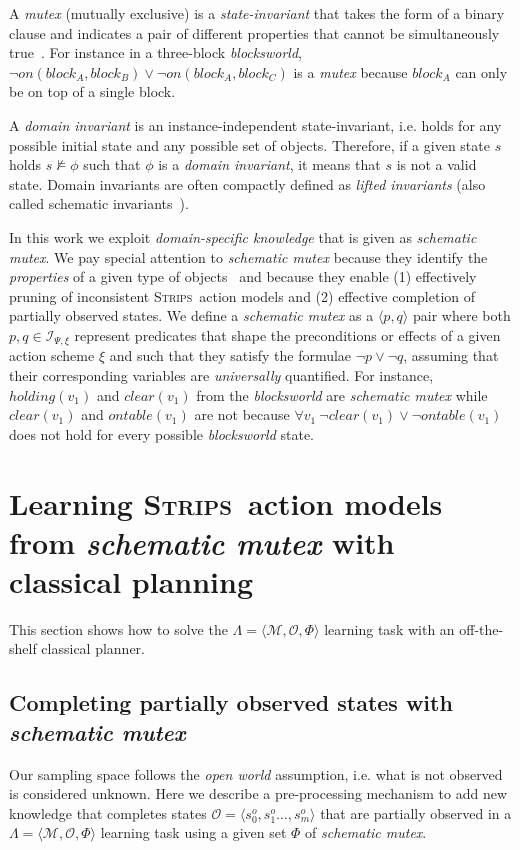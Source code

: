 \documentclass{article}
\newcommand{\tup}[1]{{\langle #1 \rangle}}
\newcommand{\strips}{\textsc{Strips}}
\begin{document}
A {\em mutex} (mutually exclusive) is a {\em state-invariant} that takes the form of a binary clause and indicates a pair of different properties that cannot be simultaneously true~\cite{kautz:mutex:IJCAI1999}. For instance in a three-block {\em blocksworld}, $\neg on(block_A,block_B)\vee \neg on(block_A,block_C)$ is a {\em mutex} because $block_A$ can only be on top of a single block.

A {\em domain invariant} is an instance-independent state-invariant, i.e. holds for any possible initial state and any possible set of objects. Therefore, if a given state $s$ holds $s\nvDash \phi$ such that $\phi$ is a {\em domain invariant}, it means that $s$ is not a valid state. Domain invariants are often compactly defined as {\em lifted invariants} (also called schematic invariants~\cite{rintanen:schematicInvariants:AAAI2017}).

In this work we exploit {\em domain-specific knowledge} that is given as  {\em schematic mutex}. We pay special attention to {\em schematic mutex} because they identify the {\em properties} of a given type of objects~\cite{fox:TIM:JAIR1998} and because they enable (1) effectively pruning of inconsistent \strips\ action models and (2) effective completion of partially observed states.  We define a {\em schematic mutex} as a $\tup{p,q}$ pair where both $p,q\in{\mathcal I}_{\Psi,\xi}$ represent predicates that shape the preconditions or effects of a given action scheme $\xi$ and such that they satisfy the formulae $\neg p\vee \neg q$, assuming that their corresponding variables are {\em universally} quantified. For instance, $holding(v_1)$ and $clear(v_1)$ from the {\em blocksworld} are {\em schematic mutex} while $clear(v_1)$ and $ontable(v_1)$ are not because $\forall v_1\ \neg clear(v_1)\vee\neg ontable(v_1)$ does not hold for every possible {\em blocksworld} state.



\section{Learning \strips\ action models from {\em schematic mutex} with classical planning}
\label{sec:compilation}
This section shows how to solve the $\Lambda=\tup{\mathcal{M},{\mathcal O},\Phi}$ learning task with an off-the-shelf classical planner.

\subsection{Completing partially observed states with {\em schematic mutex}}
Our sampling space follows the {\em open world} assumption, i.e. what is not observed is considered unknown. Here we describe a pre-processing mechanism to add new knowledge that completes states $\mathcal{O}=\tup{s_0^o,s_1^o \ldots, s_m^o}$ that are partially observed in a $\Lambda=\tup{\mathcal{M},{\mathcal O},\Phi}$ learning task using a given set $\Phi$ of {\em schematic mutex}.
\end{document}
